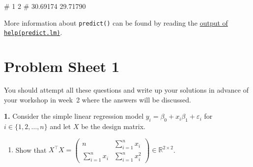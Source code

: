 \documentclass[
  a4paper,
]{article}
\newenvironment{Shaded}{\begin{snugshade}}{\end{snugshade}}
\newcommand{\NormalTok}[1]{#1}
\providecommand{\tightlist}{%
  \setlength{\itemsep}{0pt}\setlength{\parskip}{0pt}}
\theoremstyle{definition}
\theoremstyle{definition}
\theoremstyle{definition}
\theoremstyle{definition}
\theoremstyle{remark}
\begin{document}
\begin{Shaded}
\begin{Highlighting}[]
\NormalTok{\#        1        2 }
\NormalTok{\# 30.69174 29.71790}
\end{Highlighting}
\end{Shaded}

More information about \texttt{predict()} can be found by reading
the \href{https://rdrr.io/r/stats/predict.html}{output of \texttt{help(predict.lm)}}.

\clearpage

\hypertarget{P01}{%
\section*{Problem Sheet 1}\label{P01}}

You should attempt all these questions and write up your solutions in advance
of your workshop in week~2 where the answers will be discussed.

\textbf{1.} Consider the simple linear regression model
\(y_i = \beta_0 + x_{i} \beta_1 + \varepsilon_i\) for
\(i \in \{1, 2, \ldots, n\}\) and let \(X\) be the design matrix.

\begin{enumerate}
\def\labelenumi{\alph{enumi}.}
\tightlist
\item
  Show that \(\displaystyle X^\top X = \begin{pmatrix}  n & \sum_{i=1}^n x_i \\  \sum_{i=1}^n x_i & \sum_{i=1}^n x_i^2  \end{pmatrix} \in \mathbb{R}^{2\times 2}\).
\end{enumerate}
\end{document}
